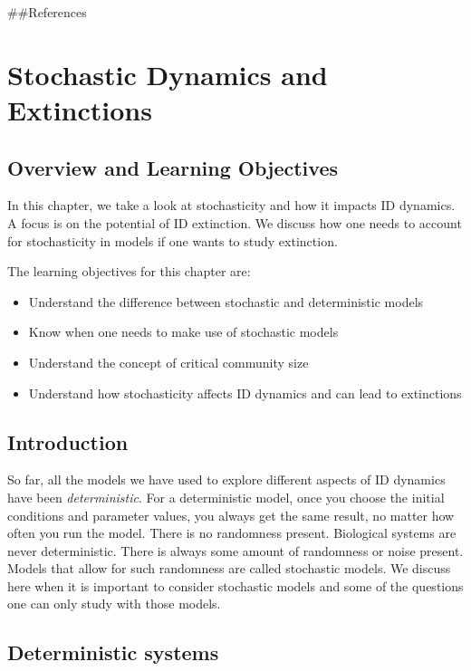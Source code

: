 \documentclass[]{book}
\providecommand{\tightlist}{%
  \setlength{\itemsep}{0pt}\setlength{\parskip}{0pt}}
\theoremstyle{definition}
\theoremstyle{definition}
\theoremstyle{definition}
\theoremstyle{remark}
\begin{document}
\#\#References

\hypertarget{stochastic}{%
\chapter{Stochastic Dynamics and Extinctions}\label{stochastic}}

\hypertarget{overview-and-learning-objectives-11}{%
\section{Overview and Learning
Objectives}\label{overview-and-learning-objectives-11}}

In this chapter, we take a look at stochasticity and how it impacts ID
dynamics. A focus is on the potential of ID extinction. We discuss how
one needs to account for stochasticity in models if one wants to study
extinction.

The learning objectives for this chapter are:

\begin{itemize}
\tightlist
\item
  Understand the difference between stochastic and deterministic models
\item
  Know when one needs to make use of stochastic models
\item
  Understand the concept of critical community size
\item
  Understand how stochasticity affects ID dynamics and can lead to
  extinctions
\end{itemize}

\hypertarget{introduction-7}{%
\section{Introduction}\label{introduction-7}}

So far, all the models we have used to explore different aspects of ID
dynamics have been \emph{deterministic}. For a deterministic model, once
you choose the initial conditions and parameter values, you always get
the same result, no matter how often you run the model. There is no
randomness present. Biological systems are never deterministic. There is
always some amount of randomness or noise present. Models that allow for
such randomness are called stochastic models. We discuss here when it is
important to consider stochastic models and some of the questions one
can only study with those models.

\hypertarget{deterministic-systems}{%
\section{Deterministic systems}\label{deterministic-systems}}
\end{document}
